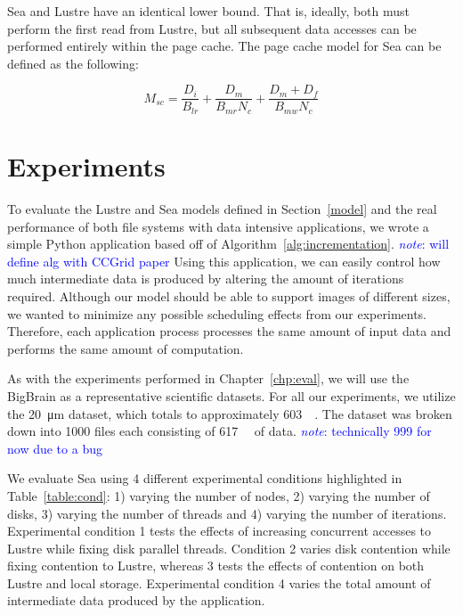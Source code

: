 \documentclass{report}
\newcommand{\note}[1]{\textcolor{blue}{\textit{note}: #1}}
\begin{document}
    Sea and Lustre have an identical lower bound. That is, ideally, both must
    perform the first read from Lustre, but all subsequent data accesses can
    be performed entirely within the page cache. The page cache model for Sea
    can be defined as the following:

    \begin{equation}\label{eq:msc}
        M_{sc} = \frac{D_{i}}{B_{lr}} + \frac{D_{m}}{B_{mr}N_{c}} + \frac{D_{m} + D_{f}}{B_{mw}N_{c}}
    \end{equation}

    \section{Experiments}\label{exp}
    To evaluate the Lustre and Sea models defined in Section~\ref{model} and the real
    performance of both file systems with data intensive applications, we wrote a simple
    Python application based off of Algorithm~\ref{alg:incrementation}. \note{will define alg with CCGrid paper}
    Using this application, we can easily control how much intermediate data is produced
    by altering the amount of iterations required. Although our model should be able
    to support images of different sizes, we wanted to minimize any possible
    scheduling effects from our experiments. Therefore, each application process
    processes the same amount of input data and performs the same amount of computation.

    As with the experiments performed in Chapter~\ref{chp:eval}, we will use the BigBrain
    as a representative scientific datasets. For all our experiments, we utilize the
    \SI{20}{\micro\meter} dataset, which totals to approximately \SI{603}{\gibi\byte}.
    The dataset was broken down into 1000 files each consisting of \SI{617}{\mebi\byte}
    of data. \note{technically 999 for now due to a bug}

    We evaluate Sea using 4 different experimental conditions highlighted in Table~\ref{table:cond}:
    1) varying the number of nodes, 2) varying the number of disks, 3) varying the number of threads and 4)
    varying the number of iterations. Experimental condition 1 tests the effects
    of increasing concurrent accesses to Lustre while fixing disk parallel threads. Condition 2
    varies disk contention while fixing contention to Lustre, whereas 3 tests the effects
    of contention on both Lustre and local storage. Experimental condition
    4 varies the total amount of intermediate data produced by the application.
    
\end{document}

